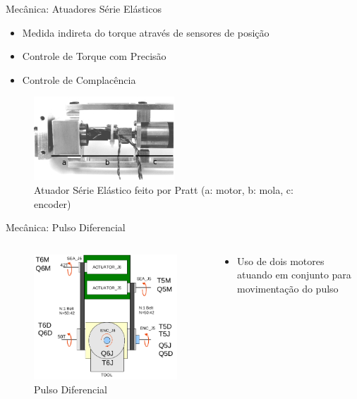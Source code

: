 \documentclass{beamer}
\begin{document}
\begin{frame}{Mecânica: Atuadores Série Elásticos}
\begin{itemize}
    \item Medida indireta do torque através de sensores de posição
    \item Controle de Torque com Precisão
    \item Controle de Complacência
\end{itemize}
\begin{figure}
    \centering
    \includegraphics[width = 0.6\linewidth]{tex/figs/sea_pratt_desc.png}
    \caption{Atuador Série Elástico feito por Pratt \newline (a: motor, b: mola, c: encoder)}
    \label{fig:mekainside}
\end{figure}
\end{frame}

\begin{frame}{Mecânica: Pulso Diferencial}
\begin{columns}
\begin{column}{0.6\textwidth}
\begin{figure}
    \centering
    \includegraphics[width = 0.8\linewidth]{tex/figs/meka_wrist.png}
    \caption{Pulso Diferencial}
    \label{fig:m3arch}
\end{figure}
\end{column}
\begin{column}{0.4\textwidth}  %
\begin{itemize}
    \item Uso de dois motores atuando em conjunto para movimentação do pulso
\end{itemize}
\end{column}
\end{columns}
\end{frame}
\end{document}
